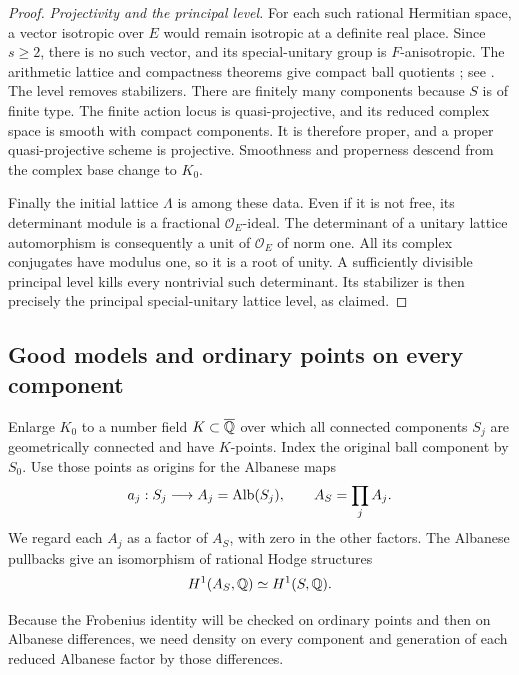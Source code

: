 \begin{proof}
\emph{Projectivity and the principal level.}
For each such rational Hermitian space, a vector isotropic over \(E\)
would remain isotropic at a definite real place.  Since \(s\geq2\),
there is no such vector, and its special-unitary group is
\(F\)-anisotropic.  The arithmetic lattice and compactness theorems
give compact ball quotients
\cite{BorelHarishChandra1962}; see
\cite[Theorem~3.3 and Proposition~3.5]{MilneShimura2017}.
The level removes stabilizers.  There are finitely many components
because \(S\) is of finite type.  The finite action locus is
quasi-projective, and its reduced complex space is smooth with compact
components.  It is therefore proper, and a proper quasi-projective
scheme is projective.  Smoothness and properness descend from the
complex base change to \(K_0\).

Finally the initial lattice \(\Lambda\) is among these data.  Even
if it is not free, its determinant module is a fractional
\(\mathcal O_E\)-ideal.  The determinant of a unitary lattice
automorphism is consequently a unit of \(\mathcal O_E\) of norm one.
All its complex conjugates have modulus one, so it is a root of unity.
A sufficiently divisible principal level kills every nontrivial such
determinant.  Its stabilizer is then precisely the principal
special-unitary lattice level, as claimed.
\end{proof}

\subsection{Good models and ordinary points on every component}\label{subsec:good-ordinary-models}

Enlarge \(K_0\) to a number field \(K\subset\overline{\mathbb{Q}}\) over which all
connected components \(S_j\) are geometrically connected and have
\(K\)-points.  Index the original ball component by \(S_0\).
Use those points as origins for the Albanese maps
\[
a_j:S_j\longrightarrow A_j=\operatorname{Alb}(S_j),\qquad A_S=\prod_j A_j.
\]
We regard each \(A_j\) as a factor of \(A_S\), with zero in the other
factors.  The Albanese pullbacks give an isomorphism of rational Hodge
structures
\begin{equation}\label{eq:albanese-h1}
H^1(A_S,\mathbb{Q})\simeq H^1(S,\mathbb{Q}).
\end{equation}

Because the Frobenius identity will be checked on ordinary points and
then on Albanese differences, we need density on every component and
generation of each reduced Albanese factor by those differences.

